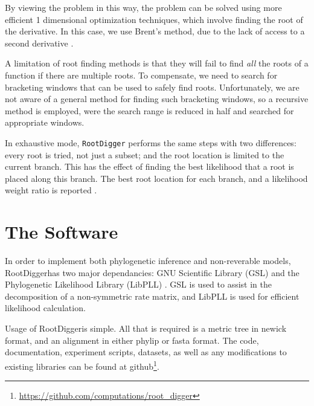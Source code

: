 \documentclass{article}
\newcommand{\RootDigger}{RootDigger}
\newcommand{\RootDiggertt}{\texttt{RootDigger}}
\begin{document}
By viewing the problem in this way, the problem can be solved using more
efficient 1 dimensional optimization techniques, which involve finding the root
of the derivative. In this case, we use Brent's method, due to the lack of
access to a second derivative \footnotemark.


A limitation of root finding methods is that they will fail to find {\it all} the
roots of a function if there are multiple roots. To compensate, we need to
search for bracketing windows that can be used to safely find roots.
Unfortunately, we are not aware of a general method for finding such bracketing
windows, so a recursive method is employed, were the search range is reduced in
half and searched for appropriate \footnotemark windows.


In exhaustive mode, \RootDiggertt{} performs the same steps with two
differences: every root is tried, not just a subset; and the root location is
limited to the current branch. This has the effect of finding the best
likelihood that a root is placed along this branch. The best root location for
each branch, and a likelihood weight ratio is reported
\cite{strimmer_inferring_2002}.

\section{The Software}

In order to implement both phylogenetic inference and non-reverable models,
\RootDigger has two major dependancies: GNU Scientific Library (GSL)
\cite{gough_gnu_2009} and the Phylogenetic Likelihood Library (LibPLL)
\cite{flouri_phylogenetic_2015}. GSL is used to assist in the decomposition of a
non-symmetric rate matrix, and LibPLL is used for efficient likelihood
calculation.

Usage of \RootDigger is simple. All that is required is a metric tree in newick
format, and an alignment in either phylip or fasta format. The code,
documentation, experiment scripts, datasets, as well as any modifications to existing
libraries can be found at
github\footnote{\url{https://github.com/computations/root_digger}}.
\end{document}

